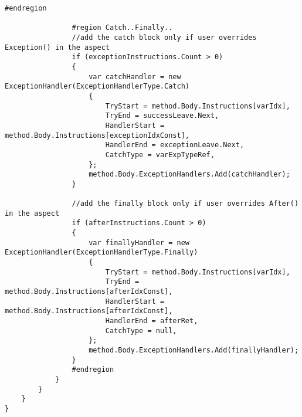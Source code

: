\begin{lstlisting}[caption={../buffalo/Injectors/MethodBoundaryInjector.cs}, label=../buffalo/Injectors/MethodBoundaryInjector.cs, frame=tb, basicstyle=\scriptsize]
                #endregion

                #region Catch..Finally..
                //add the catch block only if user overrides Exception() in the aspect
                if (exceptionInstructions.Count > 0)
                {
                    var catchHandler = new ExceptionHandler(ExceptionHandlerType.Catch)
                    {
                        TryStart = method.Body.Instructions[varIdx],
                        TryEnd = successLeave.Next,
                        HandlerStart = method.Body.Instructions[exceptionIdxConst],
                        HandlerEnd = exceptionLeave.Next,
                        CatchType = varExpTypeRef,
                    };
                    method.Body.ExceptionHandlers.Add(catchHandler);
                }

                //add the finally block only if user overrides After() in the aspect
                if (afterInstructions.Count > 0)
                {
                    var finallyHandler = new ExceptionHandler(ExceptionHandlerType.Finally)
                    {
                        TryStart = method.Body.Instructions[varIdx],
                        TryEnd = method.Body.Instructions[afterIdxConst],
                        HandlerStart = method.Body.Instructions[afterIdxConst],
                        HandlerEnd = afterRet,
                        CatchType = null,
                    };
                    method.Body.ExceptionHandlers.Add(finallyHandler);
                }
                #endregion
            }
        }
    }
}
\end{lstlisting}

